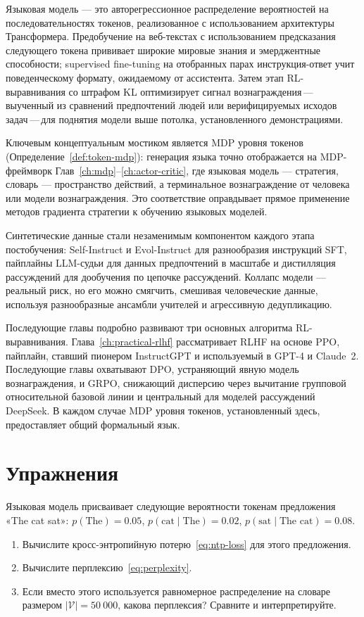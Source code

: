 Языковая модель --- это авторегрессионное распределение вероятностей на последовательностях токенов, реализованное с использованием архитектуры Трансформера. Предобучение на веб-текстах с использованием предсказания следующего токена прививает широкие мировые знания и эмерджентные способности; supervised fine-tuning на отобранных парах инструкция-ответ учит поведенческому формату, ожидаемому от ассистента. Затем этап RL-выравнивания со штрафом KL оптимизирует сигнал вознаграждения\,---\,выученный из сравнений предпочтений людей или верифицируемых исходов задач\,---\,для поднятия модели выше потолка, установленного демонстрациями.

Ключевым концептуальным мостиком является MDP уровня токенов (Определение~\ref{def:token-mdp}): генерация языка точно отображается на MDP-фреймворк Глав~\ref{ch:mdp}--\ref{ch:actor-critic}, где языковая модель --- стратегия, словарь --- пространство действий, а терминальное вознаграждение от человека или модели вознаграждения. Это соответствие оправдывает прямое применение методов градиента стратегии к обучению языковых моделей.

Синтетические данные стали незаменимым компонентом каждого этапа постобучения: Self-Instruct и Evol-Instruct для разнообразия инструкций SFT, пайплайны LLM-судьи для данных предпочтений в масштабе и дистилляция рассуждений для дообучения по цепочке рассуждений. Коллапс модели --- реальный риск, но его можно смягчить, смешивая человеческие данные, используя разнообразные ансамбли учителей и агрессивную дедупликацию.

Последующие главы подробно развивают три основных алгоритма RL-выравнивания. Глава~\ref{ch:practical-rlhf} рассматривает RLHF на основе PPO, пайплайн, ставший пионером InstructGPT и используемый в GPT-4 и Claude~2. Последующие главы охватывают DPO, устраняющий явную модель вознаграждения, и GRPO, снижающий дисперсию через вычитание групповой относительной базовой линии и центральный для моделей рассуждений DeepSeek. В каждом случае MDP уровня токенов, установленный здесь, предоставляет общий формальный язык.

\section*{Упражнения}

\begin{exercise}
\label{ex:lm-perplexity}
Языковая модель присваивает следующие вероятности токенам предложения «The cat sat»: $p(\text{The}) = 0.05$, $p(\text{cat} \mid \text{The}) = 0.02$, $p(\text{sat} \mid \text{The cat}) = 0.08$.
\begin{enumerate}
  \item Вычислите кросс-энтропийную потерю~\eqref{eq:ntp-loss} для этого предложения.
  \item Вычислите перплексию~\eqref{eq:perplexity}.
  \item Если вместо этого используется равномерное распределение на словаре размером $|\mathcal{V}| = 50~000$, какова перплексия? Сравните и интерпретируйте.
\end{enumerate}
\end{exercise}

